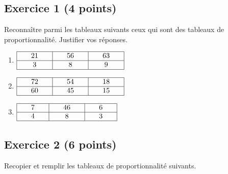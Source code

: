 \documentclass[14 pt]{extarticle}
\theoremstyle{plain}
\begin{document}
 \subsection*{Exercice 1 (4 points)}

 Reconnaître parmi les tableaux suivants ceux qui sont des tableaux de proportionnalité. Justifier vos réponses.
 \begin{enumerate}
 \item $\renewcommand{\arraystretch}{1}
\begin{array}{|c|c|c|}
\hline
\phantom{000}21\phantom{000} & \phantom{000}56\phantom{000} & \phantom{000}63\phantom{000}\\
\hline
3 & 8 & 9\\
\hline
\end{array}
\renewcommand{\arraystretch}{1}$

\item $\renewcommand{\arraystretch}{1}
\begin{array}{|c|c|c|}
\hline
\phantom{000}72\phantom{000} & \phantom{000}54\phantom{000} & \phantom{000}18\phantom{000}\\
\hline
60 & 45  & 15\\
\hline
\end{array}
\renewcommand{\arraystretch}{1}$

 \item $\renewcommand{\arraystretch}{1}
\begin{array}{|c|c|c|}
\hline
\phantom{000}7\phantom{000} & \phantom{000}46 \phantom{000} & \phantom{000}6\phantom{000}\\
\hline
4 & 8 & 3\\
\hline
\end{array}
\renewcommand{\arraystretch}{1}$



\end{enumerate}

\subsection*{Exercice 2 (6 points)}

Recopier et remplir les tableaux de proportionnalité suivants. 
\end{document}
